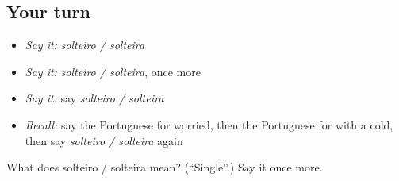 \subsection*{Your turn}
\begin{itemize}
\raggedright
  \item \emph{Say it:} \emph{solteiro / solteira}
  \item \emph{Say it:} \emph{solteiro / solteira}, once more
  \item \emph{Say it:} say \emph{solteiro / solteira}
  \item \emph{Recall:} say the Portuguese for worried, then the Portuguese for with a cold, then say \emph{solteiro / solteira} again
\end{itemize}

\begin{tcolorbox}[breakable,colback=teal!4,colframe=teal!35!black,title={Before you move on}]
What does solteiro / solteira mean? (\textquotedblleft{}Single\textquotedblright{}.) Say it once more.
\end{tcolorbox}
